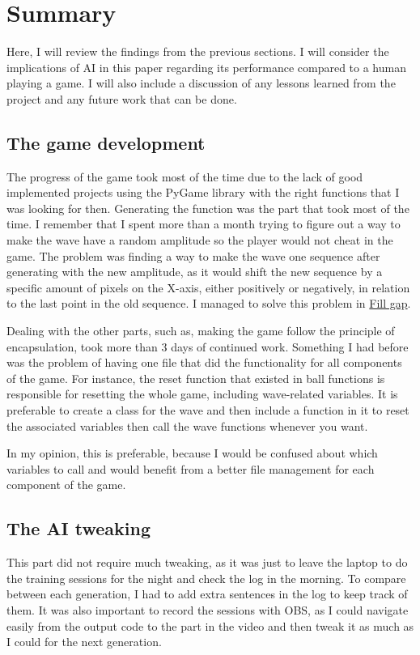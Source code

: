 \chapter{Summary}
Here, I will review the findings from the previous sections. I will consider the implications of AI in this paper regarding its performance compared to a human playing a game. I will also include a discussion of any lessons learned from the project and any future work that can be done.

\section{The game development}
The progress of the game took most of the time due to the lack of good implemented projects using the PyGame library with the right functions that I was looking for then. Generating the function was the part that took most of the time. I remember that I spent more than a month trying to figure out a way to make the wave have a random amplitude so the player would not cheat in the game. The problem was finding a way to make the wave one sequence after generating with the new amplitude, as it would shift the new sequence by a specific amount of pixels on the X-axis, either positively or negatively, in relation to the last point in the old sequence. I managed to solve this problem in \hyperref[sec:fillGap]{Fill gap}.

Dealing with the other parts, such as, making the game follow the principle of encapsulation, took more than 3 days of continued work. Something I had before was the problem of having one file that did the functionality for all components of the game. For instance, the reset function that existed in ball functions is responsible for resetting the whole game, including wave-related variables. It is preferable to create a class for the wave and then include a function in it to reset the associated variables then call the wave functions whenever you want.

In my opinion, this is preferable, because I would be confused about which variables to call and would benefit from a better file management for each component of the game.


\section{The AI tweaking}

This part did not require much tweaking, as it was just to leave the laptop to do the training sessions for the night and check the log in the morning. To compare between each generation, I had to add extra  sentences in the log to keep track of them. It was also important to record the sessions with OBS, as I could navigate easily from the output code to the part in the video and then tweak it as much as I could for the next generation.

